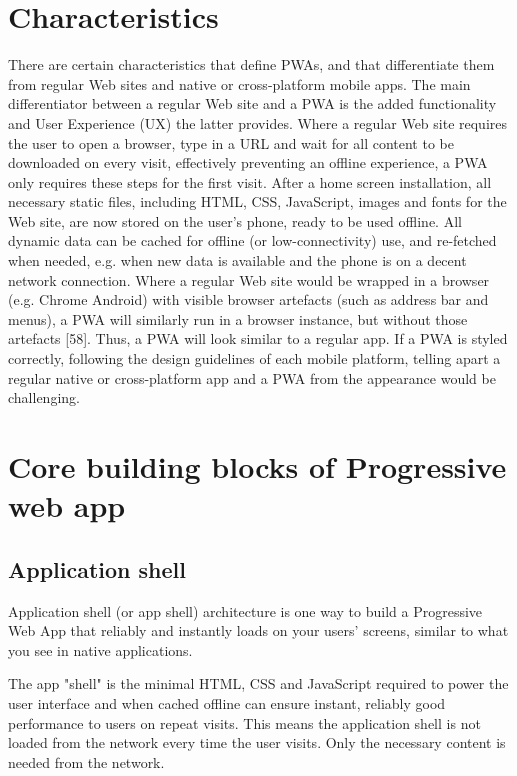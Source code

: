 \documentclass[14pt,a4paper,final]{extreport}
\begin{document}
\chapter{Characteristics}
\item 
There are certain characteristics that define PWAs, and that differentiate them from regular Web sites and native or cross-platform mobile apps. The main differentiator between a regular Web site and a PWA is the added functionality and User Experience (UX) the latter provides. Where a regular Web site requires the user to open a browser, type in a URL and wait for all content to be downloaded on every visit, effectively preventing an offline experience, a PWA only requires these steps for the first visit. After a home screen installation, all necessary static files, including HTML, CSS, JavaScript, images and fonts for the Web site, are now stored on the user’s phone, ready to be used offline. All dynamic data can be cached for offline (or low-connectivity) use, and re-fetched when needed, e.g. when new data is available and the phone is on a decent network connection.
Where a regular Web site would be wrapped in a browser (e.g. Chrome Android) with visible browser artefacts (such as address bar and menus), a PWA will similarly run in a browser instance, but without those artefacts [58]. Thus, a PWA will look similar to a regular app. If a PWA is styled correctly, following the design guidelines of each mobile platform, telling apart a regular native or cross-platform app and a PWA from the appearance would be challenging.


\chapter{Core building blocks of Progressive web app}
\section{Application shell}
\itemAn Application shell (or app shell) architecture is one way to build a Progressive Web App that reliably and instantly loads on your users' screens, similar to what you see in native applications.

The app "shell" is the minimal HTML, CSS and JavaScript required to power the user interface and when cached offline can ensure instant, reliably good performance to users on repeat visits. This means the application shell is not loaded from the network every time the user visits. Only the necessary content is needed from the network.
\end{document}
